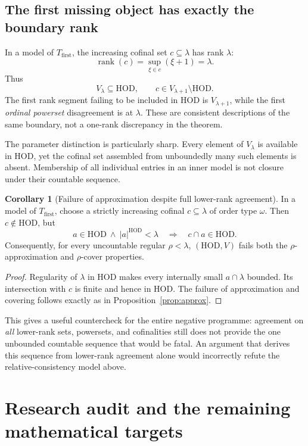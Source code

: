 \documentclass[11pt,letterpaper]{article}
\theoremstyle{definition}
\newtheorem{corollary}[definition]{Corollary}
\newcommand{\HOD}{\mathrm{HOD}}
\newcommand{\rank}{\operatorname{rank}}
\theoremstyle{remark}
\begin{document}
\subsection{The first missing object has exactly the boundary rank}

In a model of $T_{\mathrm{first}}$, the increasing cofinal set $c\subseteq\lambda$ has rank $\lambda$:
\[
 \rank(c)=\sup_{\xi\in c}(\xi+1)=\lambda.
\]
Thus
\[
 V_\lambda\subseteq\HOD,
 \qquad
 c\in V_{\lambda+1}\setminus\HOD.
\]
The first rank segment failing to be included in HOD is $V_{\lambda+1}$, while the first \emph{ordinal powerset} disagreement is at $\lambda$. These are consistent descriptions of the same boundary, not a one-rank discrepancy in the theorem.

The parameter distinction is particularly sharp. Every element of $V_\lambda$ is available in HOD, yet the cofinal set assembled from unboundedly many such elements is absent. Membership of all individual entries in an inner model is not closure under their countable sequence.

\begin{corollary}[Failure of approximation despite full lower-rank agreement]\label{cor:hod-approx}
In a model of $T_{\mathrm{first}}$, choose a strictly increasing cofinal $c\subseteq\lambda$ of order type $\omega$. Then $c\notin\HOD$, but
\[
 a\in\HOD\ \wedge\ |a|^\HOD<\lambda
 \quad\Longrightarrow\quad c\cap a\in\HOD.
\]
Consequently, for every uncountable regular $\rho<\lambda$, $(\HOD,V)$ fails both the $\rho$-approximation and $\rho$-cover properties.
\end{corollary}

\begin{proof}
Regularity of $\lambda$ in HOD makes every internally small $a\cap\lambda$ bounded. Its intersection with $c$ is finite and hence in HOD. The failure of approximation and covering follows exactly as in Proposition~\ref{prop:approx}.
\end{proof}

This gives a useful countercheck for the entire negative programme: agreement on \emph{all} lower-rank sets, powersets, and cofinalities still does not provide the one unbounded countable sequence that would be fatal. An argument that derives this sequence from lower-rank agreement alone would incorrectly refute the relative-consistency model above.

\clearpage
\section{Research audit and the remaining mathematical targets}\label{sec:audit}
\end{document}
